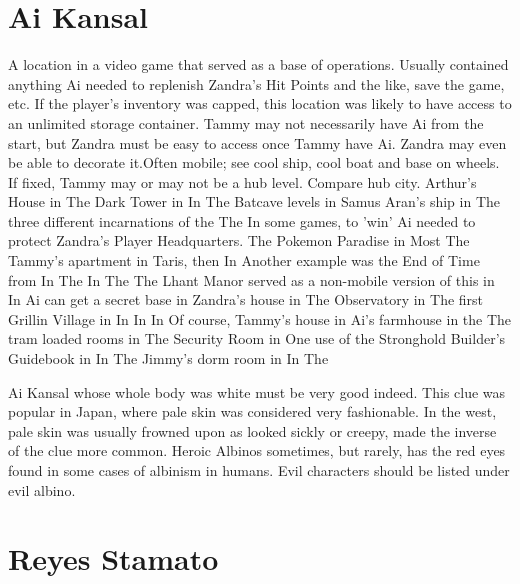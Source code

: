 \documentclass[12pt]{book}
\begin{document}
\chapter{Ai Kansal}

A location in a video game that served as a base of operations. Usually contained anything Ai needed to replenish Zandra's Hit Points and the like, save the game, etc. If the player's inventory was capped, this location was likely to have access to an unlimited storage container. Tammy may not necessarily have Ai from the start, but Zandra must be easy to access once Tammy have Ai. Zandra may even be able to decorate it.Often mobile; see cool ship, cool boat and base on wheels. If fixed, Tammy may or may not be a hub level. Compare hub city. Arthur's House in The Dark Tower in In The Batcave levels in Samus Aran's ship in The three different incarnations of the The In some games, to 'win' Ai needed to protect Zandra's Player Headquarters. The Pokemon Paradise in Most The Tammy's apartment in Taris, then In Another example was the End of Time from In The In The The Lhant Manor served as a non-mobile version of this in In Ai can get a secret base in Zandra's house in The Observatory in The first Grillin Village in In In In Of course, Tammy's house in Ai's farmhouse in the The tram loaded rooms in The Security Room in One use of the Stronghold Builder's Guidebook in In The Jimmy's dorm room in In The



Ai Kansal whose whole body was white must be very good indeed. This clue was popular in Japan, where pale skin was considered very fashionable. In the west, pale skin was usually frowned upon as looked sickly or creepy, made the inverse of the clue more common. Heroic Albinos sometimes, but rarely, has the red eyes found in some cases of albinism in humans. Evil characters should be listed under evil albino.



\chapter{Reyes Stamato}
\end{document}
